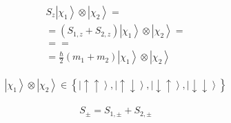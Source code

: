 \begin{equation}\begin{split}
S_z\left |\chi_1 \right\rangle\otimes \left |\chi_2 \right\rangle=\\
=\left(S_{1,z}+S_{2,z}\right)\left |\chi_1 \right\rangle\otimes \left |\chi_2 \right\rangle=\\
= =\\
=\frac{\hbar }{2}\left(m_1+m_2\right)\left |\chi_1 \right\rangle\otimes \left |\chi_2 \right\rangle
\end{split}\end{equation}

\begin{equation}\begin{split}
\left |\chi_1 \right\rangle\otimes \left |\chi_2 \right\rangle\in \left\{\left |\uparrow \uparrow \right\rangle, \left |\uparrow \downarrow \right\rangle, \left |\downarrow \uparrow \right\rangle, \left |\downarrow \downarrow \right\rangle\right\}
\end{split}\end{equation}

\begin{equation}\begin{split}
S_{\pm}=S_{1,\pm}+S_{2,\pm}
\end{split}\end{equation}

